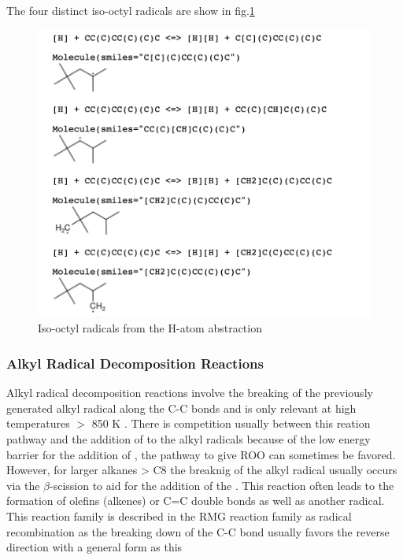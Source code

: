 
The four distinct iso-octyl radicals are show in fig.\ref{fig:iso-octyl_radicals}

\begin{figure}[!htp]
    \centering
    \includegraphics[keepaspectratio]{images/iso-octyl-radicals.png}
    \caption{Iso-octyl radicals from the H-atom abstraction}
    \label{fig:iso-octyl_radicals}
\end{figure}

\subsubsection{Alkyl Radical Decomposition Reactions}
Alkyl radical decomposition reactions involve the breaking of the previously generated alkyl radical along the C-C bonds and is only relevant at high temperatures $>$ 850 K \cite{Curran1998AOxidation}. There is competition usually between this reation pathway and the addition of  to the alkyl radicals because of the low energy barrier for the addition of , the pathway to give ROO can sometimes be favored. However, for larger alkanes > C8 the breaknig of the alkyl radical usually occurs via the $\beta$-scission to aid for the addition of the . This reaction often leads to the formation of olefins (alkenes) or C=C double bonds as well as another radical. This reaction family is described in the RMG reaction family as radical recombination as the breaking down of the C-C bond usually favors the reverse direction with a general form as this 

